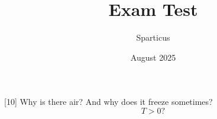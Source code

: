 \documentclass[addpoints]{exam}
\title{Exam Test}
\author{Sparticus}
\date{August 2025}
\begin{document}
\maketitle

\gradetable[v][questions]

\begin{questions}

[10]
Why is there air? And why does it freeze sometimes?
\[T>0\mathrm{?}\]

\end{questions}
\end{document}
